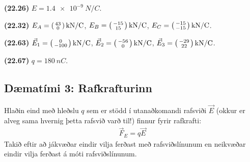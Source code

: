\begin{tcolorbox}
\begin{enumerate*}[label = \vspace{0.15cm} ]
  \item \textbf{(22.26)} $E = \SI{1.4e-9}{N/C}$.
  \item \textbf{(22.32)} $E_A = \smqty(43 \\ 0) \, \si{kN/C}$, $E_B = \smqty(-15 \\ 15) \, \si{kN/C}$, $E_C = \smqty(-15 \\ -15) \, \si{kN/C}$.
    \item \textbf{(22.63)} $\vec{E}_1 = \smqty(0 \\ -100) \, \si{kN/C}$, $\vec{E}_2 = \smqty(-56 \\ 0) \, \si{kN/C}$, $\vec{E}_3 = \smqty(-29 \\ 22) \, \si{kN/C}$.
  \item \textbf{(22.67)} $q = \SI{180}{nC}$.
\end{enumerate*}
\end{tcolorbox}

\newpage

\subsection*{Dæmatími 3: Rafkrafturinn}

\begin{tcolorbox}
Hlaðin eind með hleðslu $q$ sem er stödd í utanaðkomandi rafsviði $\vec{E}$ (okkur er alveg sama hvernig þetta rafsvið varð til!) finnur fyrir rafkrafti:
\begin{align*}
    \vec{F}_E = q \vec{E}
\end{align*}
Takið eftir að jákvæðar eindir vilja ferðast með rafsviðslínunum en neikvæðar eindir vilja ferðast á móti rafsviðslínunum.
\end{tcolorbox}

